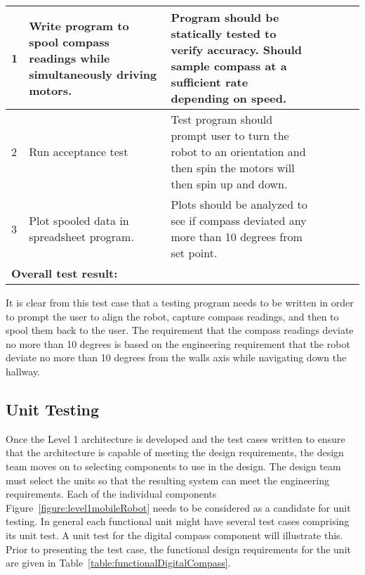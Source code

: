 \begin{table}[h]
\begin{tabular}{|m{1cm}|m{2cm}|m{3cm}|m{0.5cm}|m{0.5cm}|m{0.5cm}|m{1cm}|m{1cm}|}
1 & Write program to spool compass readings while simultaneously driving
motors. & Program should be statically tested to verify accuracy. Should
sample compass at a sufficient rate depending on speed. & & & & \multicolumn{2}{l|}{} \\ \hline
2 & Run acceptance test & Test program should prompt user to turn the
robot to an orientation and then spin the motors will then spin up and
down. & & & & \multicolumn{2}{l|}{}\\ \hline
3 & Plot spooled data in spreadsheet program. & Plots should be analyzed
to see if compass deviated any more than 10 degrees from set point. & &
& &\multicolumn{2}{l|}{}\\ \hline

\multicolumn{3}{|l|}{\textbf{Overall test result:}} &   &  &  & \multicolumn{2}{l|}{}\\ \hline
\end{tabular}
\end{table}

It is clear from this test case that a testing program needs to be
written in order to prompt the user to align the robot, capture compass
readings, and then to spool them back to the user. The requirement that
the compass readings deviate no more than 10 degrees is based on the
engineering requirement that the robot deviate no more than 10 degrees
from the walls axis while navigating down the hallway.

\subsection*{Unit Testing}
\label{subsection:unit-testing-1}


Once the Level 1 architecture is developed and the test cases written to
ensure that the architecture is capable of meeting the design
requirements, the design team moves on to selecting components to use in
the design. The design team must select the units so that the resulting
system can meet the engineering requirements. Each of the individual
components Figure~\ref{figure:level1mobileRobot}
needs to be considered as a candidate for unit
testing. In general each functional unit might have several test cases
comprising its unit test. A unit test for the digital compass component
will illustrate this. Prior to presenting the test case, the functional
design requirements for the unit are given in 
Table~\ref{table:functionalDigitalCompass}.


